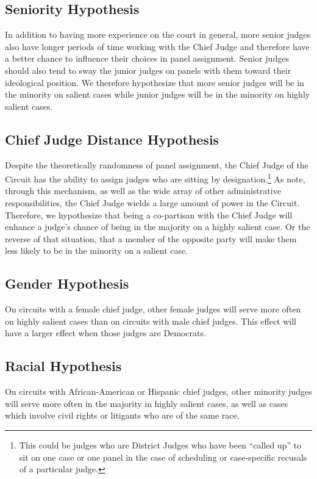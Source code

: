 \documentclass[12pt]{article}
\begin{document}
\subsection*{Seniority Hypothesis}
In addition to having more experience on the court in general, more senior judges also have longer periods of time working with the Chief Judge and therefore have a better chance to influence their choices in panel assignment.  Senior judges should also tend to sway the junior judges on panels with them toward their ideological position.  We therefore hypothesize that more senior judges will be in the minority on salient cases while junior judges will be in the minority on highly salient cases.

\subsection*{Chief Judge Distance Hypothesis}
Despite the theoretically randomness of panel assignment, the Chief Judge of the Circuit has the ability to assign judges who are sitting by designation.\footnote{This could be judges who are District Judges who have been ``called up'' to sit on one case or one panel in the case of scheduling or case-specific recusals of a particular judge.}  As \citet{Atkins1974} note, through this mechanism, as well as the wide array of other administrative responsibilities, the Chief Judge wields a large amount of power in the Circuit.  Therefore, we hypothesize that being a co-partisan with the Chief Judge will enhance a judge's chance of being in the majority on a highly salient case.  Or the reverse of that situation, that a member of the opposite party will make them less likely to be in the minority on a salient case.   

\subsection*{Gender Hypothesis}
On circuits with a female chief judge, other female judges will serve more often on highly salient cases than on circuits with male chief judges.  This effect will have a larger effect when those judges are Democrats.

\subsection*{Racial Hypothesis}
On circuits with African-American or Hispanic chief judges, other minority judges will serve more often in the majority in highly salient cases, as well as cases which involve civil rights or litigants who are of the same race.
\end{document}
